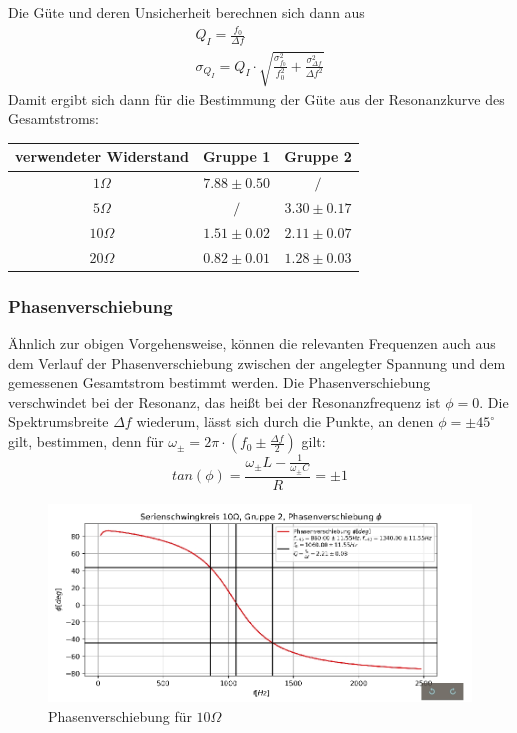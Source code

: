\documentclass[a4paper, 11pt]{article}
\begin{document}
Die Güte und deren Unsicherheit berechnen sich dann aus 
\begin{eqnarray*}
Q_I = \frac{f_0}{\Delta f}				\\
\sigma_{Q_I} = Q_I \cdot \sqrt{\frac{\sigma_{f_0}^2}{f_0^2} + \frac{\sigma_{\Delta f}^2}{\Delta f^2}}
\end{eqnarray*}
Damit ergibt sich dann für die Bestimmung der Güte aus der Resonanzkurve des Gesamtstroms:
\begin{center}
\renewcommand{\arraystretch}{1.5}
\begin{tabular}{|c|c|c|}
\hline verwendeter Widerstand	& Gruppe 1	& Gruppe 2	\\
\hline $  1 \Omega $		&	$ 7.88 \pm 0.50 $	&	$ / $ 	\\
\hline $  5 \Omega $		&	$ / $	&	$ 3.30 \pm 0.17$	\\
\hline $ 10 \Omega $		&	$ 1.51 \pm 0.02 $	&	$ 2.11 \pm 0.07$	\\
\hline $ 20 \Omega $		&	$ 0.82 \pm 0.01 $	&	$ 1.28 \pm 0.03$	\\
\hline
\end{tabular}
\end{center}

\subsubsection{Phasenverschiebung}
Ähnlich zur obigen Vorgehensweise, können die relevanten Frequenzen auch aus dem Verlauf der Phasenverschiebung zwischen der angelegter Spannung und dem gemessenen Gesamtstrom bestimmt werden. Die Phasenverschiebung verschwindet bei der Resonanz, das heißt bei der Resonanzfrequenz ist $\phi = 0$. Die Spektrumsbreite $\Delta f$ wiederum, lässt sich durch die Punkte, an denen $\phi = \pm 45^\circ $ gilt, bestimmen, denn für $\omega_{\pm} = 2 \pi \cdot \left( f_0 \pm \frac{\Delta f}{2} \right)$ gilt:
\[  tan(\phi) = \frac{\omega_{\pm} L - \frac{1}{\omega_{\pm} C}}{R} = \pm 1 \]
\begin{figure}[H]
	\centering
	\includegraphics[trim = 0mm 0mm 0mm 0mm,clip, width=13cm]{Bilder/Selection_G2-10Ohm-Phi.jpg}%
	\caption[Phasenverschiebung für $ 10 \Omega$]{Phasenverschiebung für $ 10 \Omega$}%
	\label{pic:Abbildung 3}%
\end{figure}
\end{document}

